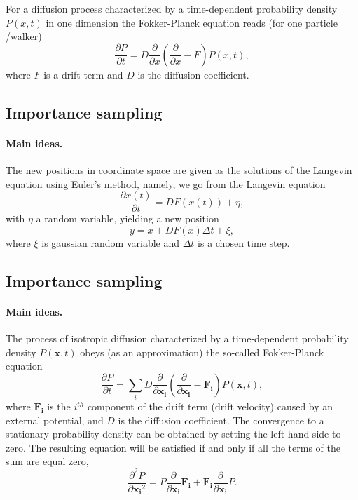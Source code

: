 \documentclass[%
twoside,                 %
final,                   %
10pt]{article}
\begin{document}
For a diffusion process characterized by a time-dependent probability density $P(x,t)$ in one dimension the Fokker-Planck
equation reads (for one particle /walker) 
\[
   \frac{\partial P}{\partial t} = D\frac{\partial }{\partial x}\left(\frac{\partial }{\partial x} -F\right)P(x,t),
\]
where $F$ is a drift term and $D$ is the diffusion coefficient.




\subsection{Importance sampling}

\paragraph{Main ideas.}
The new positions in coordinate space are given as the solutions of the Langevin equation using Euler's method, namely,
we go from the Langevin equation
\[ 
   \frac{\partial x(t)}{\partial t} = DF(x(t)) +\eta,
\]
with $\eta$ a random variable,
yielding a new position 
\[
   y = x+DF(x)\Delta t +\xi,
\]
where $\xi$ is gaussian random variable and $\Delta t$ is a chosen time step.



\subsection{Importance sampling}

\paragraph{Main ideas.}
The process of isotropic diffusion characterized by a time-dependent probability density $P(\mathbf{x},t)$ obeys (as an approximation) the so-called Fokker-Planck equation 
\[
   \frac{\partial P}{\partial t} = \sum_i D\frac{\partial }{\partial \mathbf{x_i}}\left(\frac{\partial }{\partial \mathbf{x_i}} -\mathbf{F_i}\right)P(\mathbf{x},t),
\]
where $\mathbf{F_i}$ is the $i^{th}$ component of the drift term (drift velocity) caused by an external potential, and $D$ is the diffusion coefficient. The convergence to a stationary probability density can be obtained by setting the left hand side to zero. The resulting equation will be satisfied if and only if all the terms of the sum are equal zero,
\[
\frac{\partial^2 P}{\partial {\mathbf{x_i}^2}} = P\frac{\partial}{\partial {\mathbf{x_i}}}\mathbf{F_i} + \mathbf{F_i}\frac{\partial}{\partial {\mathbf{x_i}}}P.
\]
\end{document}

